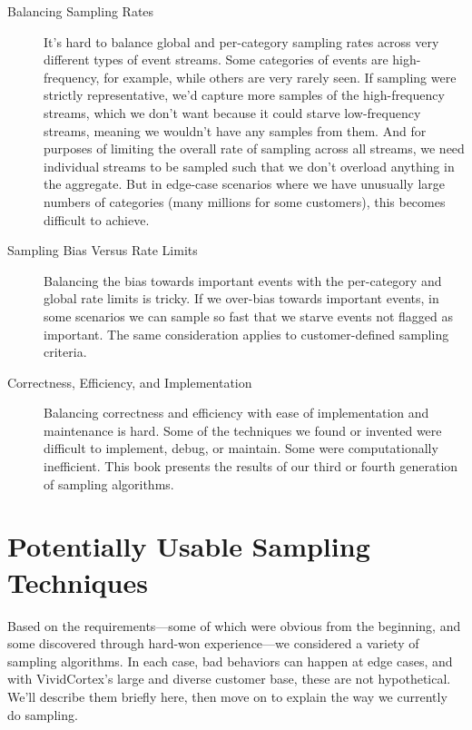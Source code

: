 \documentclass{vivid_layout}
\begin{document}
\begin{description}

\item[Balancing Sampling Rates] It's hard to balance global and per-category
sampling rates across very different types of event streams.  Some categories of
events are high-frequency, for example, while others are very rarely seen. If
sampling were strictly representative, we'd capture more samples of the
high-frequency streams, which we don't want because it could starve
low-frequency streams, meaning we wouldn't have any samples from them. And for
purposes of limiting the overall rate of sampling across all streams, we need
individual streams to be sampled such that we don't overload anything in the
aggregate. But in edge-case scenarios where we have unusually large numbers of
categories (many millions for some customers), this becomes difficult to
achieve.

\item[Sampling Bias Versus Rate Limits] Balancing the bias towards important
events with the per-category and global rate limits is tricky. If we over-bias
towards important events, in some scenarios we can sample so fast that we starve
events not flagged as important. The same consideration applies to
customer-defined sampling criteria.

\item[Correctness, Efficiency, and Implementation] Balancing correctness and
efficiency with ease of implementation and maintenance is hard. Some of the
techniques we found or invented were difficult to implement, debug, or maintain.
Some were computationally inefficient. This book presents the results of our
third or fourth generation of sampling algorithms.

\end{description}

\section{Potentially Usable Sampling Techniques}

Based on the requirements---some of which were obvious from the beginning, and
some discovered through hard-won experience---we considered a variety of
sampling algorithms. In each case, bad behaviors can happen at edge cases, and
with VividCortex's large and diverse customer base, these are not hypothetical.
We'll describe them briefly here, then move on to explain the way we currently
do sampling.
\end{document}
